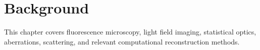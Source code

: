 \chapter{Background}

This chapter covers fluorescence microscopy, light field imaging, statistical
optics, aberrations, scattering, and relevant computational reconstruction
methods.

